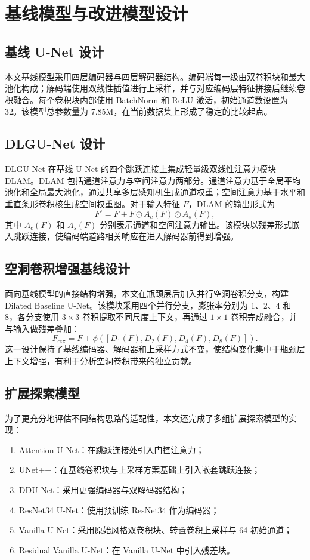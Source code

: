 \documentclass[12pt,a4paper]{ctexart}
\begin{document}
\section{基线模型与改进模型设计}
\subsection{基线 U-Net 设计}
本文基线模型采用四层编码器与四层解码器结构。编码端每一级由双卷积块和最大池化构成；解码端使用双线性插值进行上采样，并与对应编码层特征拼接后继续卷积融合。每个卷积块内部使用 BatchNorm 和 ReLU 激活，初始通道数设置为 32。该模型总参数量为 7.85M，在当前数据集上形成了稳定的比较起点。

\subsection{DLGU-Net 设计}
DLGU-Net 在基线 U-Net 的四个跳跃连接上集成轻量级双线性注意力模块 DLAM。DLAM 包括通道注意力与空间注意力两部分。通道注意力基于全局平均池化和全局最大池化，通过共享多层感知机生成通道权重；空间注意力基于水平和垂直条形卷积核生成空间权重图。对于输入特征 $F$，DLAM 的输出形式为
\[
F' = F + F \odot A_c(F) \odot A_s(F),
\]
其中 $A_c(F)$ 和 $A_s(F)$ 分别表示通道和空间注意力输出。该模块以残差形式嵌入跳跃连接，使编码端道路相关响应在进入解码器前得到增强。

\subsection{空洞卷积增强基线设计}
面向基线模型的直接结构增强，本文在瓶颈层后加入并行空洞卷积分支，构建 Dilated Baseline U-Net。该模块采用四个并行分支，膨胀率分别为 1、2、4 和 8，各分支使用 $3 \times 3$ 卷积提取不同尺度上下文，再通过 $1 \times 1$ 卷积完成融合，并与输入做残差叠加：
\[
F_{\text{ctx}} = F + \phi([D_1(F), D_2(F), D_4(F), D_8(F)]).
\]
这一设计保持了基线编码器、解码器和上采样方式不变，使结构变化集中于瓶颈层上下文增强，有利于分析空洞卷积带来的独立贡献。

\subsection{扩展探索模型}
为了更充分地评估不同结构思路的适配性，本文还完成了多组扩展探索模型的实现：
\begin{enumerate}[label=\arabic*)]
    \item Attention U-Net：在跳跃连接处引入门控注意力；
    \item UNet++：在基线卷积块与上采样方案基础上引入嵌套跳跃连接；
    \item DDU-Net：采用更强编码器与双解码器结构；
    \item ResNet34 U-Net：使用预训练 ResNet34 作为编码器；
    \item Vanilla U-Net：采用原始风格双卷积块、转置卷积上采样与 64 初始通道；
    \item Residual Vanilla U-Net：在 Vanilla U-Net 中引入残差块。
\end{enumerate}
\end{document}
